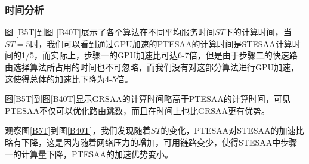 \subsubsection{时间分析}

图 \ref{B5T}到图 \ref{B40T}展示了各个算法在不同平均服务时间$ST$下的计算时间，当$ST=5$时，我们可以看到通过GPU加速的PTESAA的计算时间是STESAA计算时间的1/5，而实际上，步骤一的GPU加速比可达6-7倍，但是由于步骤二的快速路由选择算法所占用的时间也不可忽略，而我们没有对这部分算法进行GPU加速，这使得总体的加速比下降为4-5倍。

图\ref{B5T}到图\ref{B40T}显示GRSAA的计算时间略高于PTESAA的计算时间，可见PTESAA不仅可以优化路由跳数，而且在时间上也比GRSAA更有优势。

观察图\ref{B5T}到图\ref{B40T}，我们发现随着$ST$的变化，PTESAA对STESAA的加速比略有下降，这是因为随着网络压力的增加，可用链路变少，使得STESAA中步骤一的计算量下降，PTESAA的加速优势变小。
